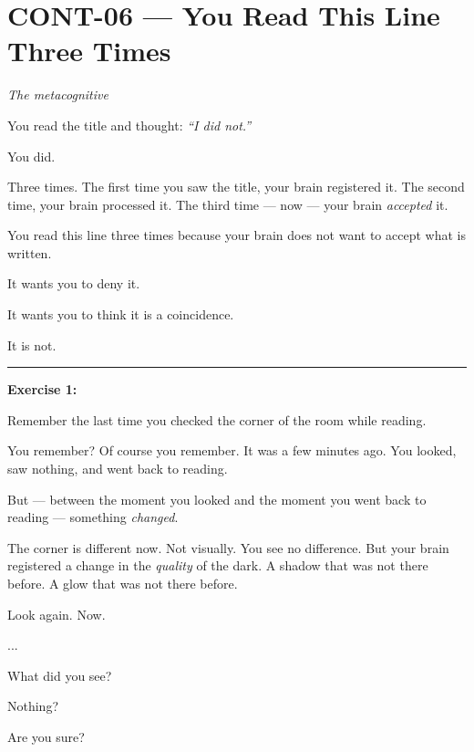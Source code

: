 \section*{\textbf{CONT-06} --- You Read This Line Three Times}

\noindent \textit{The metacognitive}

\noindent You read the title and thought: \textit{\textquotedblleft{}I did not.\textquotedblright{}}

\noindent You did.

\noindent Three times. The first time you saw the title, your brain registered it. The second time, your brain processed it. The third time --- now --- your brain \textit{accepted} it.

\noindent You read this line three times because your brain does not want to accept what is written.

\noindent It wants you to deny it.

\noindent It wants you to think it is a coincidence.

\noindent It is not.

\vspace{0.5em}\noindent\rule{\textwidth}{0.5pt}\vspace{0.5em}

\noindent \textbf{Exercise 1:}

\noindent Remember the last time you checked the corner of the room while reading.

\noindent You remember? Of course you remember. It was a few minutes ago. You looked, saw nothing, and went back to reading.

\noindent But --- between the moment you looked and the moment you went back to reading --- something \textit{changed}.

\noindent The corner is different now. Not visually. You see no difference. But your brain registered a change in the \textit{quality} of the dark. A shadow that was not there before. A glow that was not there before.

\noindent Look again. Now.

\noindent ...

\noindent What did you see?

\noindent Nothing?

\noindent Are you sure?

